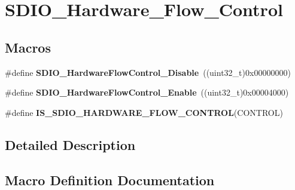 \hypertarget{group___s_d_i_o___hardware___flow___control}{}\section{S\+D\+I\+O\+\_\+\+Hardware\+\_\+\+Flow\+\_\+\+Control}
\label{group___s_d_i_o___hardware___flow___control}
\subsection*{Macros}
\begin{DoxyCompactItemize}
\item 
\hypertarget{group___s_d_i_o___hardware___flow___control_ga7529a3c8a11ac685bde4aafa12c8a977}{}\#define {\bfseries S\+D\+I\+O\+\_\+\+Hardware\+Flow\+Control\+\_\+\+Disable}~((uint32\+\_\+t)0x00000000)\label{group___s_d_i_o___hardware___flow___control_ga7529a3c8a11ac685bde4aafa12c8a977}

\item 
\hypertarget{group___s_d_i_o___hardware___flow___control_gab6cfef6778d829f3dcefc6c2bad7c9aa}{}\#define {\bfseries S\+D\+I\+O\+\_\+\+Hardware\+Flow\+Control\+\_\+\+Enable}~((uint32\+\_\+t)0x00004000)\label{group___s_d_i_o___hardware___flow___control_gab6cfef6778d829f3dcefc6c2bad7c9aa}

\item 
\#define {\bfseries I\+S\+\_\+\+S\+D\+I\+O\+\_\+\+H\+A\+R\+D\+W\+A\+R\+E\+\_\+\+F\+L\+O\+W\+\_\+\+C\+O\+N\+T\+R\+O\+L}(C\+O\+N\+T\+R\+O\+L)
\end{DoxyCompactItemize}


\subsection{Detailed Description}


\subsection{Macro Definition Documentation}
\hypertarget{group___s_d_i_o___hardware___flow___control_gad8be549f8348479d064dff21343ae411}{}
